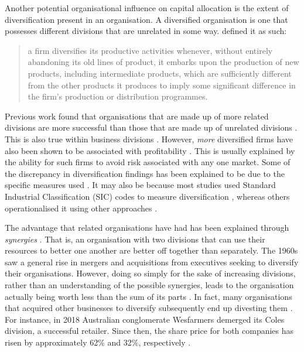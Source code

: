 \documentclass[a4paper, nobind, dvipsnames]{templates/ociamthesis}
\theoremstyle{definition}
\theoremstyle{definition}
\theoremstyle{definition}
\theoremstyle{definition}
\theoremstyle{remark}
\begin{document}
Another potential organisational influence on capital allocation is the extent
of diversification present in an organisation. A diversified organisation is one
that possesses different divisions that are unrelated in some way. \textcite[p.~96]{penrose2009} defined it as such:

\begin{quote}
a firm diversifies its productive activities whenever, without entirely
abandoning its old lines of product, it embarks upon the production of new
products, including intermediate products, which are sufficiently different
from the other products it produces to imply some significant difference in
the firm's production or distribution programmes.
\end{quote}

Previous work found that organisations that are made up of more related
divisions are more successful than those that are made up of unrelated divisions
\autocite{harrison1993,rumelt1974,shelton1988,wernerfelt1988}. This is also true
within business divisions \autocite{davis1992}. However, \emph{more} diversified firms have
also been shown to be associated with profitability \autocite{grant1988}. This is
usually explained by the ability for such firms to avoid risk associated with
any one market. Some of the discrepancy in diversification findings has been
explained to be due to the specific measures used \autocite{lubatkin1986}. It may also
be because most studies used Standard Industrial Classification (SIC) codes to
measure diversification \autocite[e.g.,][]{rumelt1974}, whereas others operationalised it
using other approaches \autocite[e.g., resource-based;][]{harrison1993}.

The advantage that related organisations have had has been explained through
\emph{synergies} \autocite{barney1988}. That is, an organisation with two divisions that can
use their resources to better one another are better off together than
separately. The 1960s saw a general rise in mergers and acquisitions from
executives seeking to diversify their organisations. However, doing so simply
for the sake of increasing divisions, rather than an understanding of the
possible synergies, leads to the organisation actually being worth less than the
sum of its parts \autocite[known as a \emph{diversification discount};][]{lang1994}. In fact,
many organisations that acquired other businesses to diversify subsequently end
up divesting them \autocite{porter1987}. For instance, in 2018 Australian conglomerate
Wesfarmers demerged its Coles division, a successful retailer. Since then, the
share price for both companies has risen by approximately 62\% and 32\%,
respectively \autocite{boyd2021}.
\end{document}
